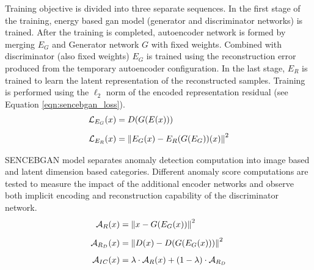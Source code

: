 Training objective is divided into three separate sequences. In the first stage of the training,
energy based gan model (generator and discriminator networks) is trained. After the training 
is completed, autoencoder network is formed by merging $E_{G}$ and Generator network $G$ with fixed weights. 
Combined with discriminator (also fixed weights) $E_{G}$ is trained using the reconstruction 
error produced from the temporary autoencoder configuration. In the last stage, $E_{R}$ is 
trained to learn the latent representation of the reconstructed samples. Training is performed 
using the $\ell_{2}$ norm of the encoded representation residual (see Equation \ref{eqn:sencebgan_loss}). 
\begin{equation}
	\label{eqn:sencebgan_loss}
	\begin{aligned}
		\mathcal{L}_{E_{G}}(x) &= D(G(E(x))) \\[5pt]
		\mathcal{L}_{E_{R}}(x) &= \left\lVert E_{G}(x) - E_{R}(G(E_{G}))(x)\right\rVert^2
 	\end{aligned}
\end{equation}

SENCEBGAN model separates anomaly detection computation into image based and latent dimension based
categories. Different anomaly score computations are tested to measure the impact of the additional
encoder networks and observe both implicit encoding and reconstruction capability of the
discriminator network. 
\begin{equation}
	\label{eqn:sencebgan_eqn_im}
	\begin{aligned}
	\mathcal{A}_{R}(x) & = \left\lVert x - G(E_{G}(x))\right\rVert^ 2 \\[5pt]
	\mathcal{A}_{R_{D}}(x) & = \left\lVert D(x) - D(G(E_{G}(x)))\right\rVert^2\\[5pt]
	\mathcal{A}_{IC}(x) & = \lambda \cdot \mathcal{A}_{R}(x) + (1 - \lambda) \cdot \mathcal{A}_{R_{D}}
	\end{aligned}
\end{equation}

